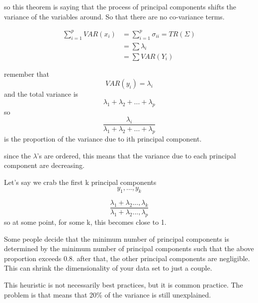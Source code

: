 so this theorem is saying that the process of principal components shifts the variance of the variables around. So that there are no co-variance terms.

\begin{align*}
    \displaystyle \sum _{i=1}^p VAR(x_i) &= 
    \displaystyle \sum _{i=1}^p \sigma_{ii}=TR(\Sigma)\\
    &= \displaystyle \sum \lambda_i \\
    &= \displaystyle \sum VAR(Y_i)
\end{align*}


remember that \[VAR(y_i)=\lambda_i \] and the total variance is \[\lambda_1+\lambda_2+ ... + \lambda_p\]
so 
\[\frac{\lambda_i}{\lambda_1+\lambda_2+ ... + \lambda_p}\]
is the proportion of the variance due to ith principal component.

since the $\lambda$'s are ordered, this means that the variance due to each principal component are decreasing.

Let's say we crab the first k principal components \[y_1,...,y_k\]

\[\frac{\lambda_1+\lambda_2...,\lambda_k}{\lambda_1+\lambda_2...,\lambda_p}\]
so at some point, for some k, this becomes close to 1.

Some people decide that the minimum number of principal components is determined by the minimum number of principal components such that the above proportion exceeds 0.8. after that, the other principal components are negligible.
This can shrink the dimensionality of your data set to just a couple.

This heuristic is not necessarily best practices, but it is common practice. The problem is that means that 20\% of the variance is still unexplained.